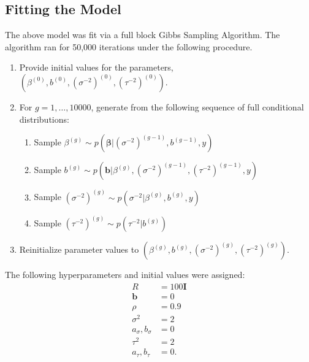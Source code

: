\documentclass[12pt, onesided]{article}
\begin{document}
\begin{flushleft}
\subsection{Fitting the Model}
The above model was fit via a full block Gibbs Sampling Algorithm. The algorithm ran for 50,000 iterations under the following procedure. 
\begin{enumerate}
\item Provide initial values for the parameters, $(\beta^{(0)}, b^{(0)}, (\sigma^{-2})^{(0)}, (\tau^{-2})^{(0)})$.
\item For $g=1,\dots ,10000$, generate from the following sequence of full conditional distributions:
\begin{enumerate}
\item Sample $\beta^{(g)}\sim p\left(\boldsymbol{\beta}|(\sigma^{-2})^{(g-1)}, b^{(g-1)}, y\right)$
\item Sample $b^{(g)}\sim p\left(\boldsymbol{b}|\beta^{(g)}, (\sigma^{-2})^{(g-1)}, (\tau^{-2})^{(g-1)}, y\right)$
\item Sample $(\sigma^{-2})^{(g)}\sim p\left(\sigma^{-2}|\beta^{(g)}, b^{(g)}, y\right)$
\item Sample $(\tau^{-2})^{(g)}\sim p\left(\tau^{-2}|b^{(g)}\right)$
\end{enumerate}
\item Reinitialize parameter values to $(\beta^{(g)}, b^{(g)}, (\sigma^{-2})^{(g)}, (\tau^{-2})^{(g)})$.
\end{enumerate}

The following hyperparameters and initial values were assigned:
\begin{equation*}
\begin{split}
 R&=100\boldsymbol{I} \\
  \boldsymbol{b}&=0\\
  \rho&= 0.9\\
  \sigma^2 &=2\\
  a_\sigma ,b_\sigma&=0\\
  \tau^2 &=2\\
  a_\tau ,b_\tau &=0.\\
\end{split}
\end{equation*}

\end{flushleft}
\end{document}
